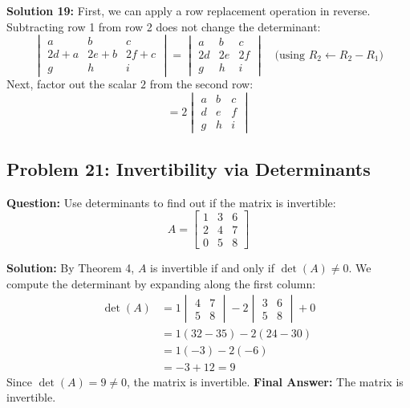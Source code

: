 \documentclass{article}
\begin{document}
\textbf{Solution 19:}
First, we can apply a row replacement operation in reverse. Subtracting row 1 from row 2 does not change the determinant:
\[ \begin{vmatrix} a & b & c \\ 2d+a & 2e+b & 2f+c \\ g & h & i \end{vmatrix} = \begin{vmatrix} a & b & c \\ 2d & 2e & 2f \\ g & h & i \end{vmatrix} \quad \text{(using } R_2 \leftarrow R_2 - R_1 \text{)} \]
Next, factor out the scalar $2$ from the second row:
\[ = 2 \begin{vmatrix} a & b & c \\ d & e & f \\ g & h & i \end{vmatrix} \]

\subsection{Problem 21: Invertibility via Determinants}
\textbf{Question:} Use determinants to find out if the matrix is invertible:
\[ A = \begin{bmatrix} 1 & 3 & 6 \\ 2 & 4 & 7 \\ 0 & 5 & 8 \end{bmatrix} \]

\textbf{Solution:}
By Theorem 4, $A$ is invertible if and only if $\det(A) \neq 0$. We compute the determinant by expanding along the first column:
\begin{align*}
    \det(A) &= 1 \begin{vmatrix} 4 & 7 \\ 5 & 8 \end{vmatrix} - 2 \begin{vmatrix} 3 & 6 \\ 5 & 8 \end{vmatrix} + 0 \\
    &= 1(32 - 35) - 2(24 - 30) \\
    &= 1(-3) - 2(-6) \\
    &= -3 + 12 = 9
\end{align*}
Since $\det(A) = 9 \neq 0$, the matrix is invertible.
\textbf{Final Answer:} The matrix is invertible.
\end{document}
